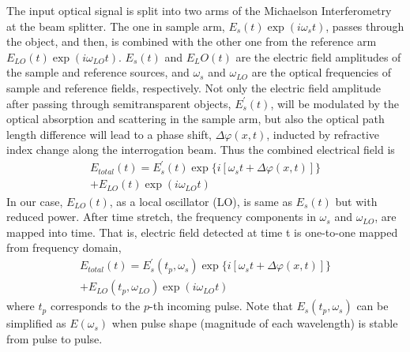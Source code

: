 \documentclass[aps,pra,reprint,superscriptaddress]{revtex4-1}
\begin{document}
The input optical signal is split into two arms of the Michaelson Interferometry at the beam splitter. The one in sample arm, $E_s(t)\exp(i\omega_s t)$, passes through the object, and then, is combined with the other one from the reference arm $E_{LO}(t)\exp(i\omega_{LO} t)$. $E_s(t)$ and $E_LO(t)$ are the electric field amplitudes of the sample and reference sources, and $\omega_s$ and $\omega_{LO}$ are the optical frequencies of sample and reference fields, respectively. Not only the electric field amplitude after passing through semitransparent objects, $E_s^\prime(t)$, will be modulated by the optical absorption and scattering in the sample arm, but also the optical path length difference will lead to a phase shift, $\Delta\varphi(x,t)$, inducted by refractive index change along the interrogation beam. Thus the combined electrical field is
\begin{multline}
E_{total}(t) = E_s^\prime(t) \exp \lbrace i[\omega_s t+\Delta\varphi(x,t)] \rbrace\\
+ E_{LO}(t) \exp(i\omega_{LO} t)
\end{multline}
In our case, $E_{LO}(t)$, as a local oscillator (LO), is same as $E_s(t)$ but with reduced power. After time stretch, the frequency components in $\omega_s$ and $\omega_{LO}$, are mapped into time. That is, electric field detected at time t is one-to-one mapped from frequency domain,
\begin{multline}
E_{total}(t) = E_s^\prime(t_p,\omega_s) \exp \lbrace i[\omega_s t+\Delta\varphi(x,t)] \rbrace\\
+ E_{LO}(t_p,\omega_{LO}) \exp(i\omega_{LO} t)
\end{multline}
where $t_p$ corresponds to the $p$-th incoming pulse. Note that $E_s(t_p,\omega_s)$ can be simplified as $E(\omega_s)$ when pulse shape (magnitude of each wavelength) is stable from pulse to pulse.
\end{document}

